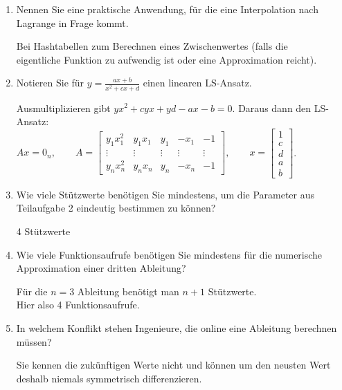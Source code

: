 \documentclass[12pt]{article}
\begin{document}
\begin{enumerate}

	\item Nennen Sie eine praktische Anwendung, für die eine Interpolation nach Lagrange in Frage kommt.
	\begin{solution}
		Bei Hashtabellen zum Berechnen eines Zwischenwertes (falls die\\ eigentliche Funktion zu aufwendig ist oder eine Approximation reicht).
	\end{solution}

	
	
	\item Notieren Sie für $y = \frac{ax + b}{x^2 + cx + d}$ einen linearen LS-Ansatz.
	\begin{solution}
	Ausmultiplizieren gibt $yx^2 + cyx + yd - ax - b = 0$. Daraus dann den LS-Ansatz:\\
	
	$Ax = 0_n,\qquad A = \begin{bmatrix}
		y_1x_1^2 & y_1x_1 & y_1 & -x_1 & -1\\
		\vdots & \vdots & \vdots & \vdots & \vdots\\
		y_nx_n^2 & y_nx_n & y_n & -x_n & -1
	\end{bmatrix}, \qquad x = \begin{bmatrix}
		1\\c\\d\\a\\b
	\end{bmatrix}$.
	\end{solution}
	
	\item Wie viele Stützwerte benötigen Sie mindestens, um die Parameter aus Teilaufgabe 2 eindeutig bestimmen zu können?
	\begin{solution}
		4 Stützwerte
	\end{solution}

	
	
	\item Wie viele Funktionsaufrufe benötigen Sie mindestens für die numerische Approximation einer dritten Ableitung?
	\begin{solution}
		Für die $n=3$ Ableitung benötigt man $n+1$ Stützwerte.\\Hier also 4 Funktionsaufrufe.
	\end{solution}

	
	\item In welchem Konflikt stehen Ingenieure, die online eine Ableitung berechnen müssen?
	\begin{solution}
		Sie kennen die zukünftigen Werte nicht und können um den neusten Wert deshalb niemals symmetrisch differenzieren.	
	\end{solution}


\end{enumerate}
\end{document}
